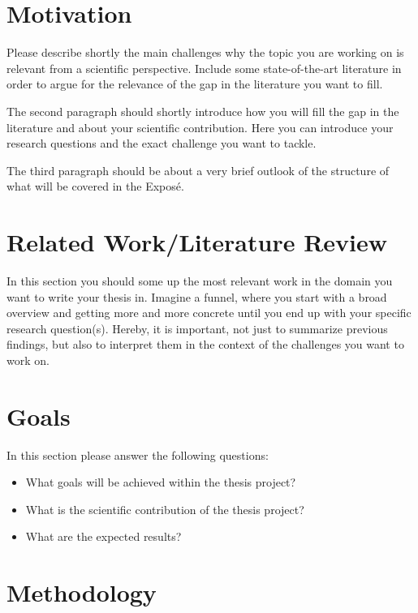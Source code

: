 \documentclass[11pt]{article}
\begin{document}



\section{Motivation}

Please describe shortly the main challenges why the topic you are working on is relevant from a scientific perspective. Include some state-of-the-art literature in order to argue for the relevance of the gap in the literature you want to fill. 

The second paragraph should shortly introduce how you will fill the gap in the literature and about your scientific contribution. Here you can introduce your research questions and the exact challenge you want to tackle.

The third paragraph should be about a very brief outlook of the structure of what will be covered in the Exposé. 


\section{Related Work/Literature Review}

In this section you should some up the most relevant work in the domain you want to write your thesis in. Imagine a funnel, where you start with a broad overview and getting more and more concrete until you end up with your specific research question(s). Hereby, it is important, not just to summarize previous findings, but also to interpret them in the context of the challenges you want to work on. 


\section{Goals}

In this section please answer the following questions: 

\begin{itemize}
    \item What goals will be achieved within the thesis project? 
    \item What is the scientific contribution of the thesis project? 
    \item What are the expected results? 
\end{itemize}

\section{Methodology}
\end{document}
